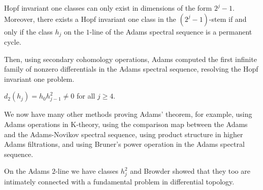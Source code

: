 
\begin{thm}\label{thm: Hopf inv}
  Hopf invariant one classes can only exist in dimensions of the form $2^j-1$.
  Moreover, there exists a Hopf invariant one class in the $(2^j-1)$-stem
  if and only if the class $h_j$ on the $1$-line of the Adams spectral sequence is a permanent cycle.
\end{thm}


Then, using secondary cohomology operations, Adams computed the first infinite family of nonzero differentials in the Adams spectral sequence, resolving the Hopf invariant one problem.

\begin{thm} \label{thm: hopf inv diff}
$d_2(h_j) = h_0 h_{j-1}^2 \neq 0$ for all $j \geq 4$.	
\end{thm}

\begin{rmk}
We now have many other methods proving Adams' theorem, for example, using Adams operations in K-theory, using the comparison map between the Adams and the Adams-Novikov spectral sequence, using product structure in higher Adams filtrations, and using Bruner's power operation in the Adams spectral sequence.
\end{rmk}


On the Adams $2$-line we have classes $h_j^2$ and Browder showed that they too are intimately connected with a fundamental problem in differential topology.

